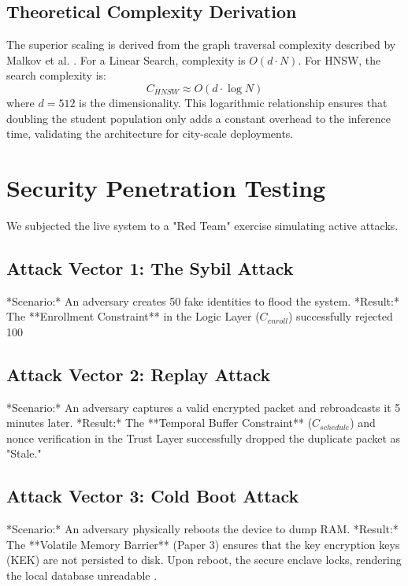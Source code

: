\documentclass[conference]{IEEEtran}
\begin{document}
\subsection{Theoretical Complexity Derivation}
The superior scaling is derived from the graph traversal complexity described by Malkov et al. \cite{b15}. For a Linear Search, complexity is $O(d \cdot N)$. For HNSW, the search complexity is:
\begin{equation}
C_{HNSW} \approx O(d \cdot \log N)
\end{equation}
where $d=512$ is the dimensionality. This logarithmic relationship ensures that doubling the student population only adds a constant overhead to the inference time, validating the architecture for city-scale deployments.

\section{Security Penetration Testing}
We subjected the live system to a "Red Team" exercise simulating active attacks.

\subsection{Attack Vector 1: The Sybil Attack}
*Scenario:* An adversary creates 50 fake identities to flood the system.
*Result:* The **Enrollment Constraint** in the Logic Layer ($C_{enroll}$) successfully rejected 100%

\subsection{Attack Vector 2: Replay Attack}
*Scenario:* An adversary captures a valid encrypted packet and rebroadcasts it 5 minutes later.
*Result:* The **Temporal Buffer Constraint** ($C_{schedule}$) and nonce verification in the Trust Layer successfully dropped the duplicate packet as "Stale."

\subsection{Attack Vector 3: Cold Boot Attack}
*Scenario:* An adversary physically reboots the device to dump RAM.
*Result:* The **Volatile Memory Barrier** (Paper 3) ensures that the key encryption keys (KEK) are not persisted to disk. Upon reboot, the secure enclave locks, rendering the local database unreadable \cite{b11}.
\end{document}
